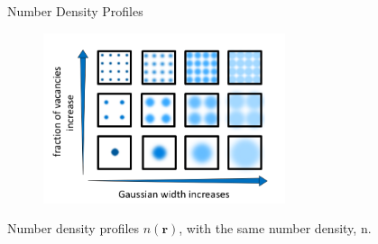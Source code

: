 \documentclass{beamer}
\renewcommand{\vec}[1]{\mathbf{#1}}
\begin{document}
\begin{frame}{Number Density Profiles}
    \begin{figure}
       \centering
       \includegraphics[height=5cm]{VaryWidthandVacancies.png}
       \label{fig:Ensemble_vary}
    \end{figure}  
    Number density profiles $n(\vec r)$, with the same number density, n.
\end{frame}





\end{document}
